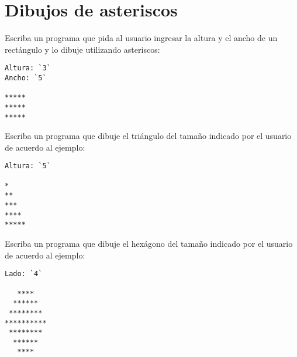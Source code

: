 \section{Dibujos de asteriscos}

Escriba un programa que pida al usuario ingresar la altura y el ancho
de un rectángulo y lo dibuje utilizando asteriscos:

\begin{lstlisting}[language=testcase]
Altura: `3`
Ancho: `5`

*****
*****
*****
\end{lstlisting}

Escriba un programa que dibuje el triángulo del tamaño indicado por el
usuario de acuerdo al ejemplo:

\begin{lstlisting}[language=testcase]
Altura: `5`

*
**
***
****
*****
\end{lstlisting}

Escriba un programa que dibuje el hexágono del tamaño indicado por el
usuario de acuerdo al ejemplo:

\begin{lstlisting}[language=testcase]
Lado: `4`

   ****
  ******
 ********
**********
 ********
  ******
   ****
\end{lstlisting}

